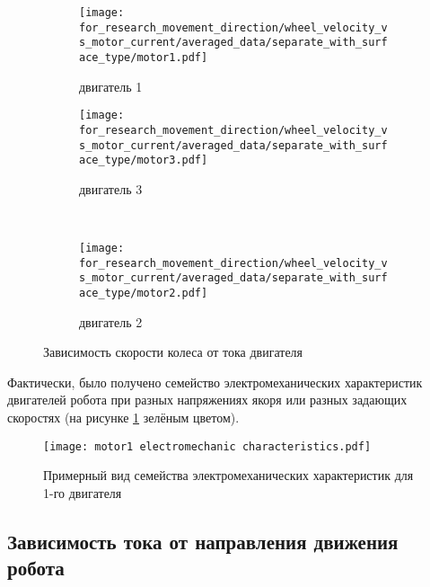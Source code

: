 \begin{figure}[H]
    \centering
    \begin{subfigure}{0.45\textwidth}
        \centering
        \texttt{[image: for\_research\_movement\_direction/wheel\_velocity\_vs\_motor\_current/averaged\_data/separate\_with\_surface\_type/motor1.pdf]}
        \caption{двигатель 1}
    \end{subfigure}
    \hspace{0.005\textwidth}
    \begin{subfigure}{0.45\textwidth}
        \centering
        \texttt{[image: for\_research\_movement\_direction/wheel\_velocity\_vs\_motor\_current/averaged\_data/separate\_with\_surface\_type/motor3.pdf]}
        \caption{двигатель 3}
    \end{subfigure} \\
    \vspace{4pt}
    \centering
    \begin{subfigure}{0.45\textwidth}
        \centering
        \texttt{[image: for\_research\_movement\_direction/wheel\_velocity\_vs\_motor\_current/averaged\_data/separate\_with\_surface\_type/motor2.pdf]}
        \caption{двигатель 2}
    \end{subfigure}
    \caption{Зависимость скорости колеса от тока двигателя}
\end{figure}

Фактически, было получено семейство электромеханических характеристик двигателей робота при разных напряжениях якоря или разных задающих скоростях (на рисунке \ref{fig:electromechanic_characteristics} зелёным цветом).

\begin{figure}[H]
    \centering
    \texttt{[image: motor1 electromechanic characteristics.pdf]}
    \caption{Примерный вид семейства электромеханических характеристик для 1-го двигателя}
    \label{fig:electromechanic_characteristics}
\end{figure}

\subsection{Зависимость тока от направления движения робота}

